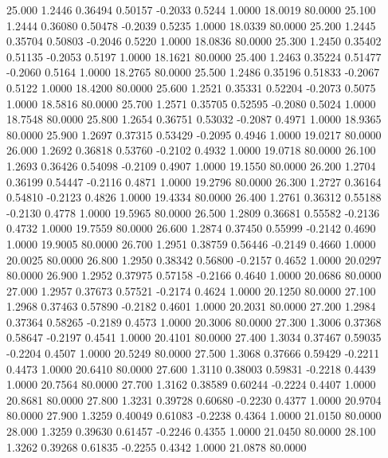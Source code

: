   25.000   1.2446   0.36494   0.50157  -0.2033   0.5244   1.0000  18.0019  80.0000
  25.100   1.2444   0.36080   0.50478  -0.2039   0.5235   1.0000  18.0339  80.0000
  25.200   1.2445   0.35704   0.50803  -0.2046   0.5220   1.0000  18.0836  80.0000
  25.300   1.2450   0.35402   0.51135  -0.2053   0.5197   1.0000  18.1621  80.0000
  25.400   1.2463   0.35224   0.51477  -0.2060   0.5164   1.0000  18.2765  80.0000
  25.500   1.2486   0.35196   0.51833  -0.2067   0.5122   1.0000  18.4200  80.0000
  25.600   1.2521   0.35331   0.52204  -0.2073   0.5075   1.0000  18.5816  80.0000
  25.700   1.2571   0.35705   0.52595  -0.2080   0.5024   1.0000  18.7548  80.0000
  25.800   1.2654   0.36751   0.53032  -0.2087   0.4971   1.0000  18.9365  80.0000
  25.900   1.2697   0.37315   0.53429  -0.2095   0.4946   1.0000  19.0217  80.0000
  26.000   1.2692   0.36818   0.53760  -0.2102   0.4932   1.0000  19.0718  80.0000
  26.100   1.2693   0.36426   0.54098  -0.2109   0.4907   1.0000  19.1550  80.0000
  26.200   1.2704   0.36199   0.54447  -0.2116   0.4871   1.0000  19.2796  80.0000
  26.300   1.2727   0.36164   0.54810  -0.2123   0.4826   1.0000  19.4334  80.0000
  26.400   1.2761   0.36312   0.55188  -0.2130   0.4778   1.0000  19.5965  80.0000
  26.500   1.2809   0.36681   0.55582  -0.2136   0.4732   1.0000  19.7559  80.0000
  26.600   1.2874   0.37450   0.55999  -0.2142   0.4690   1.0000  19.9005  80.0000
  26.700   1.2951   0.38759   0.56446  -0.2149   0.4660   1.0000  20.0025  80.0000
  26.800   1.2950   0.38342   0.56800  -0.2157   0.4652   1.0000  20.0297  80.0000
  26.900   1.2952   0.37975   0.57158  -0.2166   0.4640   1.0000  20.0686  80.0000
  27.000   1.2957   0.37673   0.57521  -0.2174   0.4624   1.0000  20.1250  80.0000
  27.100   1.2968   0.37463   0.57890  -0.2182   0.4601   1.0000  20.2031  80.0000
  27.200   1.2984   0.37364   0.58265  -0.2189   0.4573   1.0000  20.3006  80.0000
  27.300   1.3006   0.37368   0.58647  -0.2197   0.4541   1.0000  20.4101  80.0000
  27.400   1.3034   0.37467   0.59035  -0.2204   0.4507   1.0000  20.5249  80.0000
  27.500   1.3068   0.37666   0.59429  -0.2211   0.4473   1.0000  20.6410  80.0000
  27.600   1.3110   0.38003   0.59831  -0.2218   0.4439   1.0000  20.7564  80.0000
  27.700   1.3162   0.38589   0.60244  -0.2224   0.4407   1.0000  20.8681  80.0000
  27.800   1.3231   0.39728   0.60680  -0.2230   0.4377   1.0000  20.9704  80.0000
  27.900   1.3259   0.40049   0.61083  -0.2238   0.4364   1.0000  21.0150  80.0000
  28.000   1.3259   0.39630   0.61457  -0.2246   0.4355   1.0000  21.0450  80.0000
  28.100   1.3262   0.39268   0.61835  -0.2255   0.4342   1.0000  21.0878  80.0000
